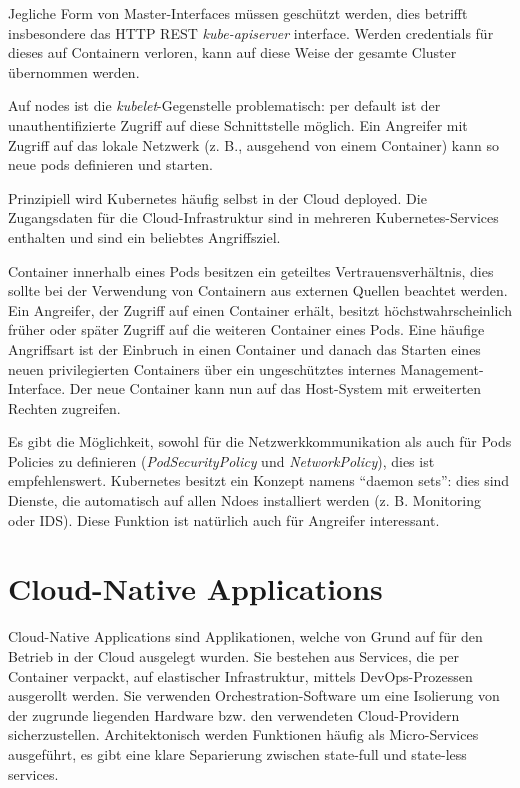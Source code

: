 Jegliche Form von Master-Interfaces müssen geschützt werden, dies betrifft insbesondere das HTTP REST \textit{kube-apiserver} interface. Werden credentials für dieses auf Containern verloren, kann auf diese Weise der gesamte Cluster übernommen werden.

Auf nodes ist die \textit{kubelet}-Gegenstelle problematisch: per default ist der unauthentifizierte Zugriff auf diese Schnittstelle möglich. Ein Angreifer mit Zugriff auf das lokale Netzwerk (z. B., ausgehend von einem Container) kann so neue pods definieren und starten.

Prinzipiell wird Kubernetes häufig selbst in der Cloud deployed. Die Zugangsdaten für die Cloud-Infrastruktur sind in mehreren Kubernetes-Services enthalten und sind ein beliebtes Angriffsziel.

Container innerhalb eines Pods besitzen ein geteiltes Vertrauensverhältnis, dies sollte bei der Verwendung von Containern aus externen Quellen beachtet werden. Ein Angreifer, der Zugriff auf einen Container erhält, besitzt höchstwahrscheinlich früher oder später Zugriff auf die weiteren Container eines Pods. Eine häufige Angriffsart ist der Einbruch in einen Container und danach das Starten eines neuen privilegierten Containers über ein ungeschütztes internes Management-Interface. Der neue Container kann nun auf das Host-System mit erweiterten Rechten zugreifen.

Es gibt die Möglichkeit, sowohl für die Netzwerkkommunikation als auch für Pods Policies zu definieren (\textit{PodSecurityPolicy} und \textit{NetworkPolicy}), dies ist empfehlenswert. Kubernetes besitzt ein Konzept namens ``daemon sets'': dies sind Dienste, die automatisch auf allen Ndoes installiert werden (z. B. Monitoring oder IDS). Diese Funktion ist natürlich auch für Angreifer interessant.

\chapter{Cloud-Native Applications}

Cloud-Native Applications sind Applikationen, welche von Grund auf für den Betrieb in der Cloud ausgelegt wurden. Sie bestehen aus Services, die per Container verpackt, auf elastischer Infrastruktur, mittels DevOps-Prozessen ausgerollt werden. Sie verwenden Orchestration-Software um eine Isolierung von der zugrunde liegenden Hardware bzw. den verwendeten Cloud-Providern sicherzustellen. Architektonisch werden Funktionen häufig als Micro-Services ausgeführt, es gibt eine klare Separierung zwischen state-full und state-less services.

